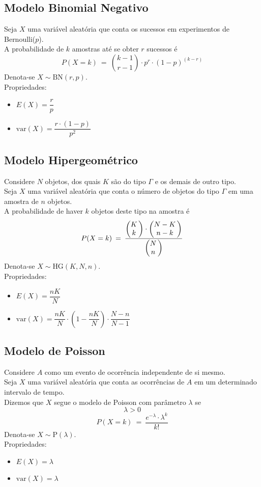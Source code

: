 \documentclass{article}
\makeatletter
\newcommand{\Binom}[2]{%
  \left(
    \begin{array}{@{}c@{\,}} #1\\#2 \end{array}
  \right)
}
\makeatother
\begin{document}
\pagebreak


\subsection{Modelo Binomial Negativo}
Seja $X$ uma variável aleatória que conta os sucessos em experimentos de Bernoulli($p$). \\
A probabilidade de $k$ amostras até se obter $r$ sucessos é
\[ P(X = k) \>=\> {{k -1} \choose {r - 1}} \cdot p^r \cdot {(1 - p)}^{(k - r)} \]
Denota-se $X \sim \text{BN}(r, p)$. \\[10pt]
Propriedades:
\begin{itemize}
  \item $E(X) = \dfrac{r}{p}$
  \item $\text{var}(X) = \dfrac{r \cdot (1 - p)}{p^2}$
\end{itemize}


\subsection{Modelo Hipergeométrico}
Considere $N$ objetos, dos quais $K$ são do tipo $\Gamma$ e os demais de outro tipo. \\
Seja $X$ uma variável aleatória que conta o número de objetos do tipo $\Gamma$ em uma amostra de $n$ objetos. \\
A probabilidade de haver $k$ objetos deste tipo na amostra é
\[ P(X = k) \>=\> \frac{\Binom{K}{k} \cdot \Binom{N - K}{n - k}}{\Binom{N}{n}} \]
Denota-se $X \sim \text{HG}(K, N, n)$. \\[10pt]
Propriedades:
\begin{itemize}
  \item $E(X) = \dfrac{nK}{N}$
  \item $\text{var}(X) = \dfrac{nK}{N} \cdot \left( 1 - \dfrac{nK}{N} \right) \cdot \dfrac{N - n}{N - 1}$
\end{itemize}


\subsection{Modelo de Poisson}
Considere $A$ como um evento de ocorrência independente de si mesmo. \\
Seja $X$ uma variável aleatória que conta as ocorrências de $A$ em um determinado intervalo de tempo. \\
Dizemos que $X$ segue o modelo de Poisson com parâmetro $\lambda$ se
\[ \lambda > 0 \]
\[ P(X = k) \>=\> \frac{e^{-\lambda} \cdot \lambda^k}{k!} \]
Denota-se $X \sim \text{P}(\lambda)$. \\[10pt]
Propriedades:
\begin{itemize}
  \item $E(X) = \lambda$
  \item $\text{var}(X) = \lambda$
\end{itemize}
\end{document}
